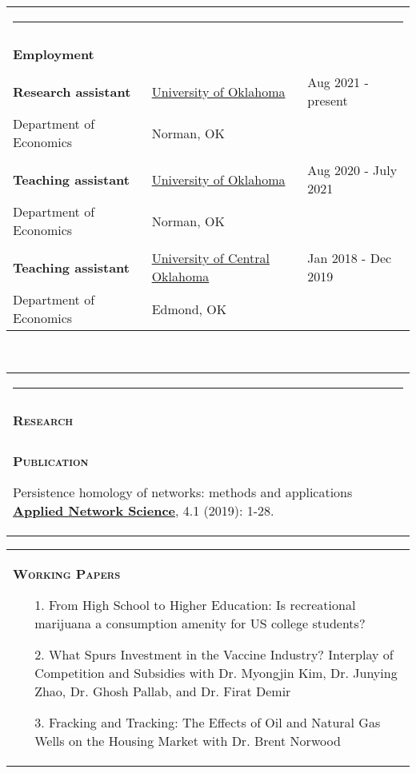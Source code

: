 \documentclass[10pt,letterpaper]{article}
\begin{document}
\begin{tabular}{p{2.75in}p{3.05in}p{4.0in}}
\multicolumn{3}{p{7.5in}}{\hrule}\\
\\
{\textbf{\large{Employment}}} & &\\
\\
\textbf{Research assistant} & \href{http://www.ou.edu/}{University of Oklahoma}& Aug 2021 - present\\
Department of Economics      & Norman, OK &\\
\\
\textbf{Teaching assistant} & \href{http://www.ou.edu/}{University of Oklahoma}& Aug 2020 - July 2021\\
Department of Economics      & Norman, OK &\\
\\
\textbf{Teaching assistant} & \href{https://www.uco.edu/}{University of Central Oklahoma}& Jan 2018 - Dec 2019\\
Department of Economics      & Edmond,  OK &\\

\end{tabular} 
\\


\begin{tabular}{p{7.5in}}
\multicolumn{1}{p{7.5in}}{\hrule}\\ \\
{\large \textsc{\textbf{\large{Research}}}} \\ \\
{\textsc{\textbf{Publication}}}

\indent Persistence homology of networks: methods and applications \href{https://appliednetsci.springeropen.com/articles/10.1007/s41109-019-0179-3}{\textbf{Applied Network Science}},  4.1 (2019): 1-28.
\end{tabular}


\begin{tabular}{p{7.5in}}
\\
{\textsc{\textbf{Working Papers}}}
\begin{enumerate}
\item[1.]  From High School to Higher Education: Is recreational marijuana a consumption amenity  for US college students?
\item[2.] What Spurs Investment in the Vaccine Industry? Interplay of Competition and Subsidies with Dr. Myongjin Kim, Dr. Junying Zhao, Dr. Ghosh Pallab, and Dr. Firat Demir 
\item[3.] Fracking and Tracking: The Effects of Oil and Natural Gas Wells on the Housing Market with Dr. Brent Norwood
\end{enumerate}

\end{tabular}
\end{document}
